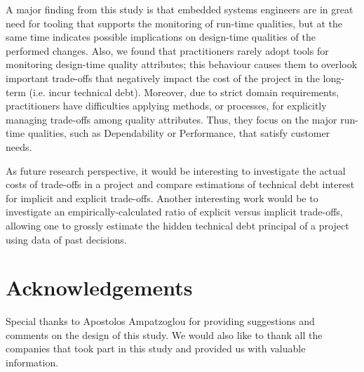A major finding from this study is that embedded systems engineers are in great need for tooling that supports the monitoring of run-time qualities, but at the same time indicates possible implications on design-time qualities of the performed changes.
Also, we found that practitioners rarely adopt tools for monitoring design-time quality attributes; this behaviour causes them to overlook important trade-offs that negatively impact the cost of the project in the long-term (i.e. incur technical debt).
Moreover, due to strict domain requirements, practitioners have difficulties applying methods, or processes, for explicitly managing trade-offs among quality attributes. Thus, they focus on the major run-time qualities, such as Dependability or Performance, that satisfy customer needs.

As future research perspective, it would be interesting to investigate the actual costs of trade-offs in a project and compare estimations of technical debt interest for implicit and explicit trade-offs.
Another interesting work would be to investigate an empirically-calculated ratio of explicit versus implicit trade-offs, allowing one to grossly estimate the hidden technical debt principal of a project using data of past decisions.

\section*{Acknowledgements}
Special thanks to Apostolos Ampatzoglou for providing suggestions and comments on the design of this study.
We would also like to thank all the companies that took part in this study and provided us with valuable information.